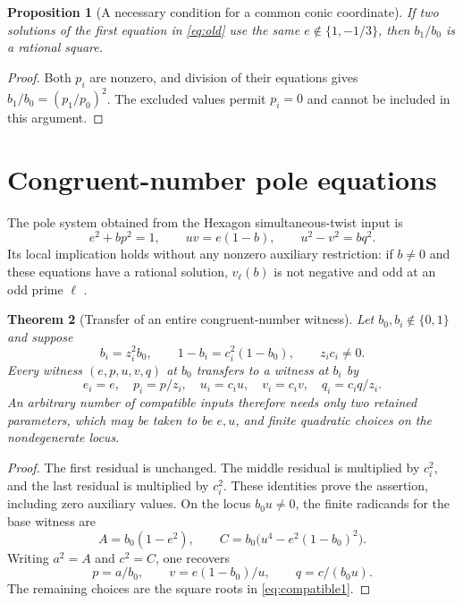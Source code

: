 \documentclass[11pt,a4paper]{article}
\newtheorem{theorem}{Theorem}[section]
\newtheorem{proposition}[theorem]{Proposition}
\theoremstyle{definition}\newtheorem{definition}[theorem]{Definition}
\theoremstyle{remark}\newtheorem{remark}[theorem]{Remark}
\begin{document}
\begin{proposition}[A necessary condition for a common conic coordinate]
If two solutions of the first equation in \eqref{eq:old} use the same
$e\notin\{1,-1/3\}$, then $b_1/b_0$ is a rational square.
\end{proposition}
\begin{proof}
Both $p_i$ are nonzero, and division of their equations gives
$b_1/b_0=(p_1/p_0)^2$. The excluded values permit $p_i=0$ and cannot
be included in this argument.
\end{proof}

\section{Congruent-number pole equations}
The pole system obtained from the Hexagon simultaneous-twist input is
\begin{equation}\label{eq:new}
 e^2+bp^2=1,\qquad uv=e(1-b),\qquad u^2-v^2=bq^2.
\end{equation}
Its local implication holds without any nonzero auxiliary restriction:
if $b\ne0$ and these equations have a rational solution, $v_\ell(b)$
is not negative and odd at an odd prime $\ell$ \cite{Congruent}.

\begin{theorem}[Transfer of an entire congruent-number witness]\label{thm:new}
Let $b_0,b_i\notin\{0,1\}$ and suppose
\begin{equation}\label{eq:compatible1}
 b_i=z_i^2b_0,\qquad 1-b_i=c_i^2(1-b_0),
 \qquad z_i c_i\ne0.
\end{equation}
Every witness $(e,p,u,v,q)$ at $b_0$ transfers to a witness at $b_i$ by
\begin{equation}\label{eq:newtransfer}
 e_i=e,\quad p_i=p/z_i,\quad u_i=c_i u,
 \quad v_i=c_i v,\quad q_i=c_i q/z_i.
\end{equation}
An arbitrary number of compatible inputs therefore needs only two
retained parameters, which may be taken to be $e,u$, and finite
quadratic choices on the nondegenerate locus.
\end{theorem}
\begin{proof}
The first residual is unchanged. The middle residual is multiplied by
$c_i^2$, and the last residual is multiplied by $c_i^2$. These identities
prove the assertion, including zero auxiliary values. On the locus
$b_0u\ne0$, the finite radicands for the base witness are
\[
 A=b_0(1-e^2),\qquad
 C=b_0\bigl(u^4-e^2(1-b_0)^2\bigr).
\]
Writing $a^2=A$ and $c^2=C$, one recovers
\[
 p=a/b_0,\qquad v=e(1-b_0)/u,\qquad q=c/(b_0u).
\]
The remaining choices are the square roots in \eqref{eq:compatible1}.
\end{proof}
\end{document}
